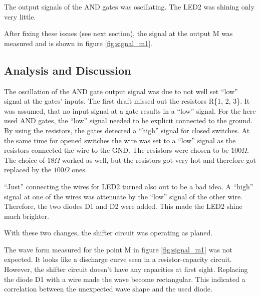\documentclass[journal]{IEEEtran}
\begin{document}
The output signals of the AND gates was oscillating. The LED2 was
shining only very little.

After fixing these issues (see next section), the signal at the
output M was measured and is shown in figure \ref{fig:signal_m1}.

\subsection{Analysis and Discussion}

The oscillation of the AND gate output signal was due to not well set ``low''
signal at the gates' inputs. The first draft missed out the resistors R\{1, 2,
3\}.
It was assumed, that no input signal at a gate results in a ``low'' signal.
For the here used AND gates, the ``low'' signal needed to be explicit connected to 
the ground. By using the resistors, the gates detected a ``high'' signal
for closed switches. At the same time for opened
switches the wire was set to a ``low'' signal as the resistors connected the
wire to the GND.
The resistors were chosen to be $100\Omega$. The choice of $18\Omega$ worked
as well, but the resistors got very
hot and therefore got replaced by the $100\Omega$ ones. 

``Just'' connecting the wires for LED2 turned also out to be a bad idea.
A ``high'' signal at one of the wires was attenuate by the ``low'' signal of
the other wire. Therefore, the two diodes D1 and D2 were added. This made the
LED2 shine much brighter.

With these two changes, the shifter circuit was operating as planed.

The wave form measured for the point M in figure \ref{fig:signal_m1} was not
expected. It looks like a discharge curve seen in a resistor-capacity circuit.
However, the shifter circuit doesn't
have any capacities at first sight. Replacing the diode D1 with a wire made the
wave become rectangular. This indicated a correlation between the unexpected
wave shape and the used diode.
\end{document}
